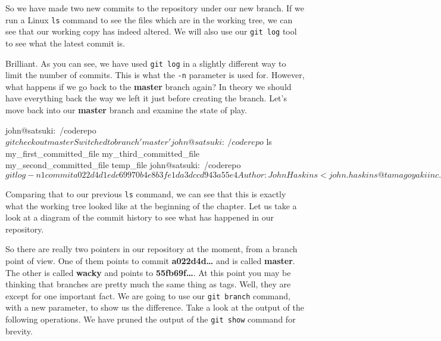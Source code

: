 So we have made two new commits to the repository under our new branch.
If we run a Linux \texttt{ls} command to see the files which are in the working tree, we can see that our working copy has indeed altered.
We will also use our \texttt{git log} tool to see what the latest commit is.


Brilliant.
As you can see, we have used \texttt{git log} in a slightly different way to limit the number of commits.
This is what the \texttt{-n} parameter is used for.
However, what happens if we go back to the \textbf{master} branch again? In theory we should have everything back the way we left it just before creating the branch.
Let's move back into our \textbf{master} branch and examine the state of play.

\begin{code}
john@satsuki:~/coderepo$ git checkout master
Switched to branch 'master'
john@satsuki:~/coderepo$ ls
my_first_committed_file   my_third_committed_file
my_second_committed_file  temp_file
john@satsuki:~/coderepo$ git log -n1
commit a022d4d1edc69970b4e8b3fe1da3dccd943a55e4
Author: John Haskins <john.haskins@tamagoyakiinc.koala>
Date:   Thu Mar 31 22:05:55 2011 +0100

    Messed with a few files
john@satsuki:~/coderepo$
\end{code}

Comparing that to our previous \texttt{ls} command, we can see that this is exactly what the working tree looked like at the beginning of the chapter.
Let us take a look at a diagram of the commit history to see what has happened in our repository.


So there are really two pointers in our repository at the moment, from a branch point of view.
One of them points to commit \textbf{a022d4d\ldots} and is called \textbf{master}.
The other is called \textbf{wacky} and points to \textbf{55fb69f\ldots}.
At this point you may be thinking that branches are pretty much the same thing as tags.
Well, they are except for one important fact.
We are going to use our \texttt{git branch} command, with a new parameter, to show us the difference.
Take a look at the output of the following operations.
We have pruned the output of the \texttt{git show} command for brevity.

